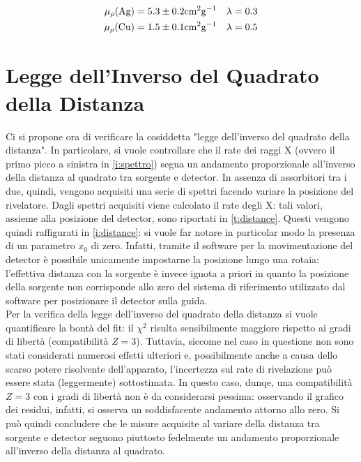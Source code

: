 \documentclass[twocolumn,10pt]{asme2ej}
\begin{document}
 \vspace{-15pt}
\begin{align*}
    \mu_{\rho}(\text{Ag}) &= 5.3\pm 0.2 \si{\centi\metre^2\gram^{-1}} & \lambda &= 0.3 \\
    \mu_{\rho}(\text{Cu}) &= 1.5\pm 0.1 \si{\centi\metre^2\gram^{-1}} & \lambda &= 0.5 
    \vspace{-5pt}
\end{align*}

	



\section{Legge dell'Inverso del Quadrato della Distanza}\label{s:distanza}

Ci si propone ora di verificare la cosiddetta "legge dell'inverso del quadrato della distanza". In particolare, si vuole
controllare che il rate dei raggi X (ovvero il primo picco a sinistra in \autoref{i:spettro}) segua un andamento
proporzionale all'inverso della distanza al quadrato tra sorgente e detector. In assenza di assorbitori tra i due,
quindi, vengono acquisiti una serie di spettri facendo variare la posizione del rivelatore. Dagli spettri acquisiti
viene calcolato il rate degli X: tali valori, assieme alla posizione del detector, sono riportati in
\autoref{t:distance}. Questi vengono quindi raffigurati in \autoref{i:distance}: si vuole far notare in particolar modo
la presenza di un parametro $x_0$ di zero. Infatti, tramite il software per la movimentazione del detector è possibile
unicamente impostarne la posizione lungo una rotaia: l'effettiva distanza con la sorgente è invece ignota a priori in
quanto la posizione della sorgente non corrisponde allo zero del sistema di riferimento utilizzato dal software per
posizionare il detector sulla guida. \\
Per la verifica della legge dell'inverso del quadrato della distanza si vuole quantificare la bontà del fit: il $\chi^2$
risulta sensibilmente maggiore rispetto ai gradi di libertà (compatibilità $Z=3$). Tuttavia, siccome nel caso in
questione non sono stati considerati numerosi effetti ulteriori e, possibilmente anche a causa dello scarso potere
risolvente dell'apparato, l'incertezza sul rate di rivelazione può essere stata (leggermente) sottostimata. In questo
caso, dunqe, una compatibilità $Z=3$ con i gradi di libertà non è da considerarsi pessima: osservando il grafico dei
residui, infatti, si osserva un soddisfacente andamento attorno allo zero. Si può quindi concludere che le misure
acquisite al variare della distanza tra sorgente e detector seguono piuttosto fedelmente un andamento proporzionale
all'inverso della distanza al quadrato. 
\end{document}
